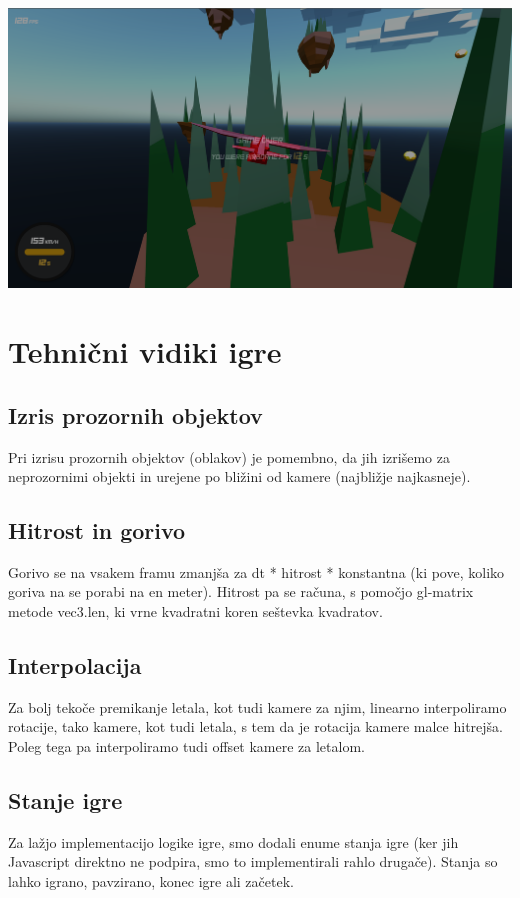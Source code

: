 \documentclass[a4paper]{article}
\begin{document}
\begin{center}
     \includegraphics[width=\columnwidth]{game over.jpg}
\end{center}

\section{Tehnični vidiki igre} %
\subsection{Izris prozornih objektov}%
Pri izrisu prozornih objektov (oblakov) je pomembno, da jih izrišemo za neprozornimi objekti in urejene po bližini od kamere (najbližje najkasneje).
\subsection{Hitrost in gorivo}%
Gorivo se na vsakem framu zmanjša za dt * hitrost * konstantna (ki pove, koliko goriva na se porabi na en meter). Hitrost pa se računa, s pomočjo gl-matrix metode vec3.len, ki vrne kvadratni koren seštevka kvadratov.
\subsection{Interpolacija}%
Za bolj tekoče premikanje letala, kot tudi kamere za njim, linearno interpoliramo rotacije, tako kamere, kot tudi letala, s tem da je rotacija kamere malce hitrejša. Poleg tega pa interpoliramo tudi offset kamere za letalom. 
\subsection{Stanje igre}%
Za lažjo implementacijo logike igre, smo dodali enume stanja igre (ker jih Javascript direktno ne podpira, smo to implementirali rahlo drugače). Stanja so lahko igrano, pavzirano, konec igre ali začetek. 
\end{document}
